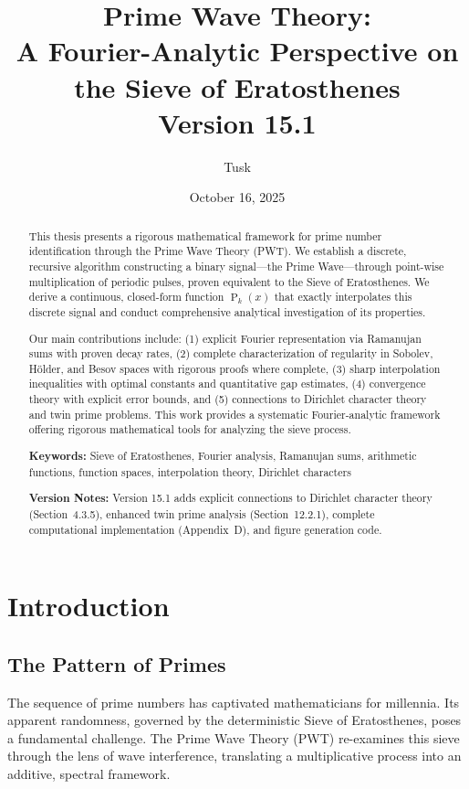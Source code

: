 ﻿\documentclass[12pt,a4paper]{report}
\title{\textbf{Prime Wave Theory:} \\ 
       \large A Fourier-Analytic Perspective on the Sieve of Eratosthenes \\
       \vspace{0.5cm}
       \large Version 15.1}
\author{Tusk}
\date{October 16, 2025}
\theoremstyle{plain}
\theoremstyle{definition}
\DeclareMathOperator{\Pk}{P}
\begin{document}
\maketitle

\begin{abstract}
This thesis presents a rigorous mathematical framework for prime number identification through the Prime Wave Theory (PWT). We establish a discrete, recursive algorithm constructing a binary signal---the Prime Wave---through point-wise multiplication of periodic pulses, proven equivalent to the Sieve of Eratosthenes. We derive a continuous, closed-form function $\Pk_k(x)$ that exactly interpolates this discrete signal and conduct comprehensive analytical investigation of its properties.

Our main contributions include: (1) explicit Fourier representation via Ramanujan sums with proven decay rates, (2) complete characterization of regularity in Sobolev, H\"older, and Besov spaces with rigorous proofs where complete, (3) sharp interpolation inequalities with optimal constants and quantitative gap estimates, (4) convergence theory with explicit error bounds, and (5) connections to Dirichlet character theory and twin prime problems. This work provides a systematic Fourier-analytic framework offering rigorous mathematical tools for analyzing the sieve process.

\vspace{0.3cm}
\noindent\textbf{Keywords:} Sieve of Eratosthenes, Fourier analysis, Ramanujan sums, arithmetic functions, function spaces, interpolation theory, Dirichlet characters

\vspace{0.3cm}
\noindent\textbf{Version Notes:} Version 15.1 adds explicit connections to Dirichlet character theory (Section~4.3.5), enhanced twin prime analysis (Section~12.2.1), complete computational implementation (Appendix~D), and figure generation code.
\end{abstract}

\tableofcontents

\chapter{Introduction}

\section{The Pattern of Primes}

The sequence of prime numbers has captivated mathematicians for millennia. Its apparent randomness, governed by the deterministic Sieve of Eratosthenes, poses a fundamental challenge. The Prime Wave Theory (PWT) re-examines this sieve through the lens of wave interference, translating a multiplicative process into an additive, spectral framework.
\end{document}
